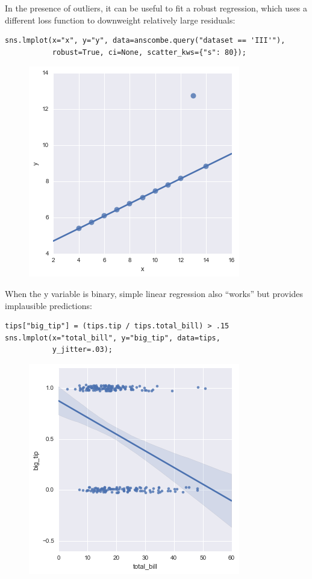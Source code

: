\documentclass{beamer}
\begin{document}
\begin{frame}
In the presence of outliers, it can be useful to fit a robust regression, which uses a different loss function to downweight relatively large residuals:
\begin{framed}
\begin{verbatim}
sns.lmplot(x="x", y="y", data=anscombe.query("dataset == 'III'"),
           robust=True, ci=None, scatter_kws={"s": 80});
               \end{verbatim}
            \end{framed}
\begin{figure}
	\centering
	\includegraphics[width=0.7\linewidth]{images/regression_27_0}

\end{figure}
\end{frame}
\begin{frame}[fragile]
When the y variable is binary, simple linear regression also “works” but provides implausible predictions:
\begin{verbatim}
tips["big_tip"] = (tips.tip / tips.total_bill) > .15
sns.lmplot(x="total_bill", y="big_tip", data=tips,
           y_jitter=.03);
        \end{verbatim}
\begin{figure}
	\centering
	\includegraphics[width=0.7\linewidth]{images/regression_29_0}
\end{figure}

\end{frame}
\end{document}
